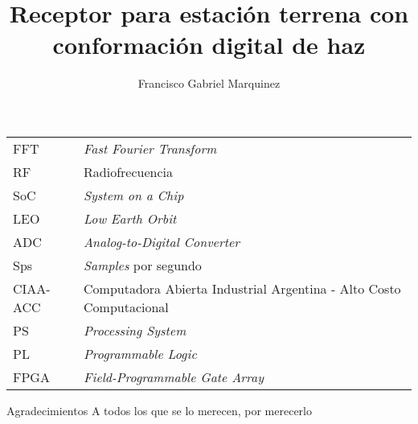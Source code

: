 \documentclass[screen, pagebackref,oneside]{ibtesis}
\title{Receptor para estación terrena con conformación digital de haz}
\author{Francisco Gabriel Marquinez}
\begin{document}
\begin{preliminary}


    \begin{abreviaturas}
        \begin{table}[H]
            \begin{tabular}{ll}
            FFT &   \textit{Fast Fourier Transform} \\
            RF  &   Radiofrecuencia                 \\
            SoC &   \textit{System on a Chip}       \\
            LEO &   \textit{Low Earth Orbit}        \\
            ADC &   \textit{Analog-to-Digital Converter} \\
            Sps &   \textit{Samples} por segundo   \\
            CIAA-ACC & Computadora Abierta Industrial Argentina - Alto Costo
            Computacional  \\
            PS  &   \textit{Processing System}  \\
            PL  &   \textit{Programmable Logic} \\
            FPGA &  \textit{Field-Programmable Gate Array}
            \end{tabular}
        \end{table}    
    \end{abreviaturas}
    
    \tableofcontents                %
    \listoffigures                  %
    \listoftables                   %
    
    
\end{preliminary}








\begin{biblio}
    
\end{biblio}

\begin{postliminary}

    \begin{seccion}{Agradecimientos}
    A todos los que se lo merecen, por merecerlo
    \end{seccion}
    
\end{postliminary}
    
\end{document}
